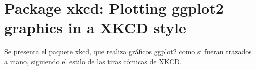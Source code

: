 \chapter{Package xkcd: Plotting ggplot2 graphics in a XKCD style}




Se presenta el paquete xkcd, que realiza gráficos ggplot2 como si fueran trazados a mano, siguiendo el estilo de las tiras cómicas de XKCD.

%

%
